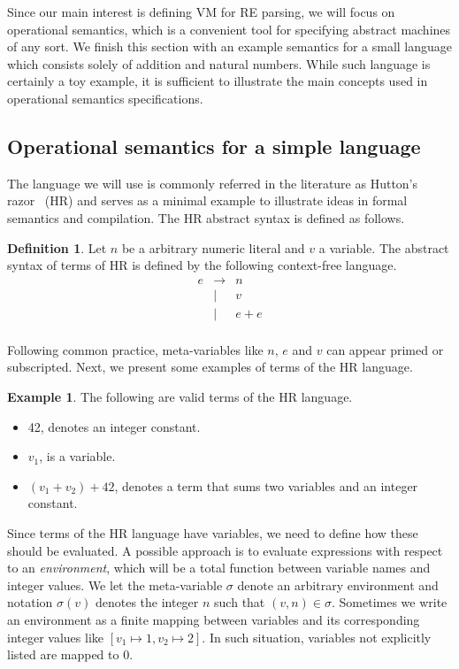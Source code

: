 \documentclass[oneside,12pt]{scrbook}
\theoremstyle{definition}
\newtheorem{Example}{Example}
\theoremstyle{plain}
\theoremstyle{definition}
\newtheorem{Definition}{Definition}
\begin{document}
Since our main interest is defining VM for RE parsing, we will focus on operational semantics, which is
a convenient tool for specifying abstract machines of any sort. We finish this section with an example semantics for
a small language which consists solely of addition and natural numbers. While such language is certainly a toy example,
it is sufficient to illustrate the main concepts used in operational semantics specifications.

\subsection{Operational semantics for a simple language}\label{subsection:simplelanguage}

The language we will use is commonly referred in the literature as Hutton's razor~\cite{Hutton98} (HR) and serves as a minimal
example to illustrate ideas in formal semantics and compilation. The HR abstract syntax is defined as follows.

\begin{Definition}
	Let $n$ be a arbitrary numeric literal and $v$ a variable. The abstract syntax of terms of HR is defined by the following
	context-free language.
	\[
	\begin{array}{lcl}
	e & \to  & n \\
	& \mid & v \\
	& \mid & e + e \\
	\end{array}
	\]
\end{Definition}

Following common practice, meta-variables like $n$, $e$ and $v$ can appear primed or subscripted. Next, we present some
examples of terms of the HR language. 

\begin{Example}
	The following are valid terms of the HR language. 
	\begin{itemize}
		\item 42, denotes an integer constant.
		\item $v_1$, is a variable.
		\item $(v_1 + v_2) + 42$, denotes a term that sums two
		variables and an integer constant.
	\end{itemize}
\end{Example}

Since terms of the HR language have variables, we need to define how these should be evaluated. A possible
approach is to evaluate expressions with respect to an \emph{environment}, which will be a total function
between variable names and integer values. We let the meta-variable $\sigma$ denote an arbitrary environment
and notation $\sigma(v)$ denotes the integer $n$ such that $(v,n) \in \sigma$. Sometimes we write an environment
as a finite mapping between variables and its corresponding integer values like $[v_1 \mapsto 1, v_2 \mapsto 2]$.
In such situation, variables not explicitly listed are mapped to 0.
\end{document}
